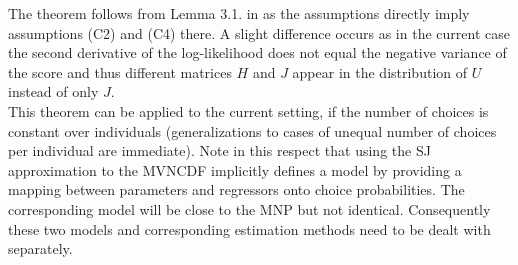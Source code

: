 \documentclass[12pt, a4paper]{article}
\numberwithin{defcounter}{section}
\numberwithin{excounter}{section}
\begin{document}
The theorem follows from Lemma 3.1. in \cite{hjort2003} as the assumptions directly imply assumptions (C2) and (C4) there. A slight difference occurs as in the current case the second derivative of the log-likelihood does not equal the negative variance of the score and thus different matrices $H$ and $J$ appear in the distribution of $U$ instead of only $J$. 
\\
This theorem can be applied to the current setting, if the number of choices is constant over individuals (generalizations to cases of unequal number of choices per individual are immediate). 
Note in this respect that using the SJ approximation to the \ac{MVNCDF} implicitly defines a model by providing a mapping between parameters and regressors onto choice probabilities. 
The corresponding model will be close to the \ac{MNP} but not identical. Consequently these two models and corresponding estimation methods need to be dealt with separately. 
\end{document}
